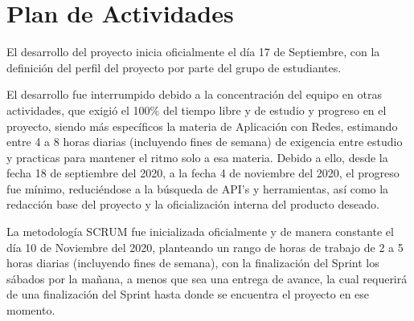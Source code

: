 \chapter{Plan de Actividades}

El desarrollo del proyecto inicia oficialmente el día 17 de Septiembre, con la definición del perfil del proyecto por parte del grupo de estudiantes.

El desarrollo fue interrumpido debido a la concentración del equipo en otras actividades, que exigió el 100\% del tiempo libre y de estudio y progreso en el proyecto, siendo más específicos la materia de Aplicación con Redes, estimando entre 4 a 8 horas diarias (incluyendo fines de semana) de exigencia entre estudio y practicas para mantener el ritmo solo a esa materia. Debido a ello, desde la fecha 18 de septiembre del 2020, a la fecha 4 de noviembre del 2020, el progreso fue mínimo, reduciéndose a la búsqueda de API's y herramientas, así como la redacción base del proyecto y la oficialización interna del producto deseado.

La metodología SCRUM fue inicializada oficialmente y de manera constante el día 10 de Noviembre del 2020, planteando un rango de horas de trabajo de 2 a 5 horas diarias (incluyendo fines de semana), con la finalización del Sprint los sábados por la mañana, a menos que sea una entrega de avance, la cual requerirá de una finalización del Sprint hasta donde se encuentra el proyecto en ese momento.


